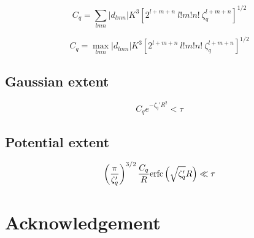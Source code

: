 \commentoutA{\documentclass[superbib,prb,epsfig,floats,twocolumn]{revtex4}}
\begin{document}
\begin{equation}
C_q=\sum_{lmn} \left|d_{lmn}\right| K^3 \left[ 2^{l+m+n} ~ l! m! n! ~ \zeta^{l+m+n}_q \right]^{1/2} 
\end{equation}

\begin{equation}
C_q=\max_{lmn} \left|d_{lmn}\right| K^3 \left[ 2^{l+m+n} ~ l! m! n! ~ \zeta^{l+m+n}_q \right]^{1/2} 
\end{equation}


\subsection{Gaussian extent}

\begin{equation}
C_q e^{-\zeta_q ' R^2 } < \tau 
\end{equation}

\subsection{Potential extent}

\begin{equation}
\left(\frac{\pi}{\zeta_q'} \right)^{3/2} \frac{C_q}{R} {\rm erfc}\left({\sqrt{\zeta_q '} R }\right) \ll \tau
\end{equation}



\section{Acknowledgement}





\begin{references}

\end{references}
\end{document}
